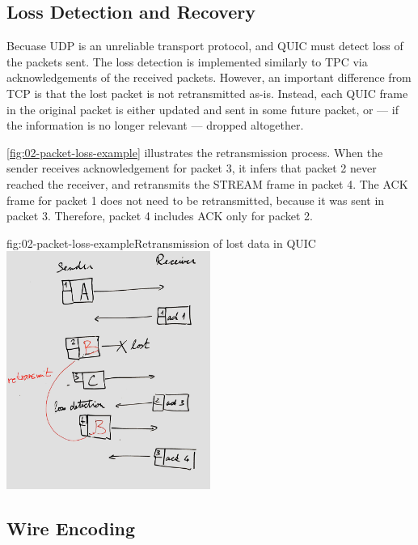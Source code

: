 \subsection{Loss Detection and Recovery}

Becuase UDP is an unreliable transport protocol, and QUIC must detect loss of the packets sent. The
loss detection is implemented similarly to TPC via acknowledgements of the received packets.
However, an important difference from TCP is that the lost packet is not retransmitted as-is.
Instead, each QUIC frame in the original packet is either updated and sent in some future packet, or
--- if the information is no longer relevant --- dropped altogether.

\autoref{fig:02-packet-loss-example} illustrates the retransmission process. When the sender
receives acknowledgement for packet 3, it infers that packet 2 never reached the receiver, and
retransmits the STREAM frame in packet 4. The ACK frame for packet 1 does not need to be
retransmitted, because it was sent in packet 3. Therefore, packet 4 includes ACK only for packet 2.


\begin{myFigure}{fig:02-packet-loss-example}{Retransmission of lost data in QUIC}
  \includegraphics[width=0.5\textwidth]{img/02-retransmission-example}
\end{myFigure}


\subsection{Wire Encoding}

